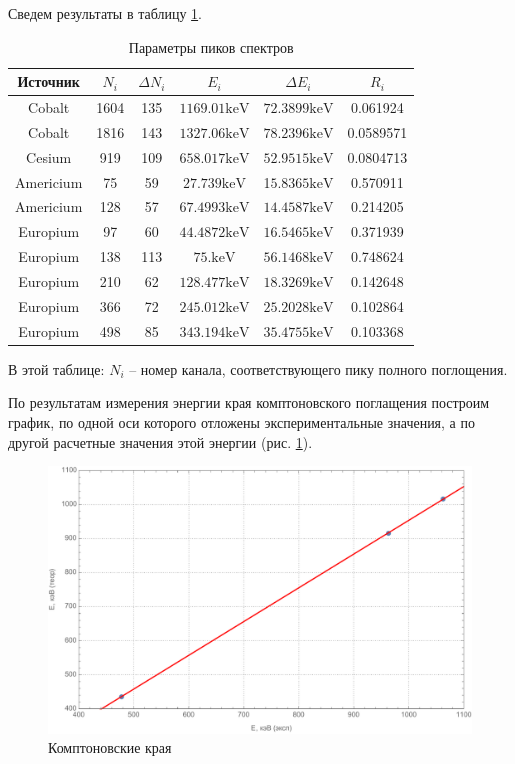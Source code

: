 \documentclass[a4paper, 12pt]{article}
\begin{document}
	 \newpage
	 \newpage
	 Сведем результаты в таблицу \ref{table1}.
	 \begin{table}[!htb]
	 	\centering
	 	\caption{Параметры пиков спектров}
	 	\begin{tabular}{|c|c|c|c|c|c|}
	 		\hline
	 		Источник & $N_i$ & $\Delta N_i$ & $E_i$ & $\Delta E_i$ & $R_i$ \\
	 		\hline
Cobalt & 1604 & 135 & $1169.01\text{keV}$ & $72.3899\text{keV}$ & 0.061924 \\
 Cobalt & 1816 & 143 & $1327.06\text{keV}$ & $78.2396\text{keV}$ & 0.0589571 \\
 Cesium & 919 & 109 & $658.017\text{keV}$ & $52.9515\text{keV}$ & 0.0804713 \\
 Americium & 75 & 59 & $27.739\text{keV}$ & 1$5.8365\text{keV}$ & 0.570911 \\
 Americium & 128 & 57 & $67.4993\text{keV}$ & $14.4587\text{keV}$ & 0.214205 \\
 Europium & 97 & 60 & $44.4872\text{keV}$ & $16.5465\text{keV}$ & 0.371939 \\
 Europium & 138 & 113 & $75.\text{keV}$ & $56.1468\text{keV}$ & 0.748624 \\
 Europium & 210 & 62 & $128.477\text{keV}$ & $18.3269\text{keV}$ & 0.142648 \\
 Europium & 366 & 72 & $245.012\text{keV}$ & $25.2028\text{keV}$ & 0.102864 \\
 Europium & 498 & 85 & $343.194\text{keV}$ & $35.4755\text{keV}$ & 0.103368 \\
 \hline
	 	\end{tabular}
	 	\label{table1}
	 \end{table}
	 В этой таблице: $N_i$ -- номер канала, соответствующего пику полного поглощения.\par
	 По результатам измерения энергии края комптоновского поглащения построим график, по одной оси которого отложены экспериментальные значения, а по другой расчетные значения этой энергии (рис. \ref{compton}).\par
	 \begin{figure}
	 	\centering
	 	\includegraphics[scale=0.5]{edges.pdf}
	 	\caption{Комптоновские края}
	 	\label{compton}
	 \end{figure}
\end{document}
